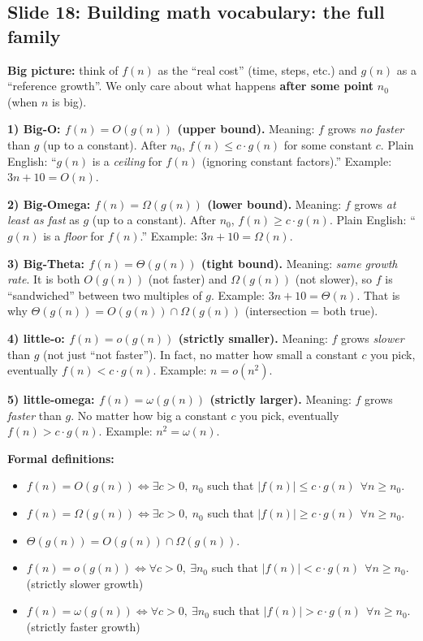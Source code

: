 \documentclass[11pt]{article}
\newcommand{\slide}[2]{\subsection*{Slide #1: #2}}
\begin{document}
\slide{18}{Building math vocabulary: the full family}
\textbf{Big picture:} think of $f(n)$ as the ``real cost'' (time, steps, etc.) and $g(n)$ as
a ``reference growth''. We only care about what happens \textbf{after some point} $n_0$
(when $n$ is big).

\textbf{1) Big-O: $f(n) = O(g(n))$ (upper bound).}
Meaning: $f$ grows \emph{no faster} than $g$ (up to a constant). After $n_0$,
$f(n) \le c \cdot g(n)$ for some constant $c$.
Plain English: ``$g(n)$ is a \emph{ceiling} for $f(n)$ (ignoring constant factors).''
Example: $3n + 10 = O(n)$.

\textbf{2) Big-Omega: $f(n) = \Omega(g(n))$ (lower bound).}
Meaning: $f$ grows \emph{at least as fast} as $g$ (up to a constant). After $n_0$,
$f(n) \ge c \cdot g(n)$.
Plain English: ``$g(n)$ is a \emph{floor} for $f(n)$.''
Example: $3n + 10 = \Omega(n)$.

\textbf{3) Big-Theta: $f(n) = \Theta(g(n))$ (tight bound).}
Meaning: \emph{same growth rate}. It is both $O(g(n))$ (not faster) and $\Omega(g(n))$
(not slower), so $f$ is ``sandwiched'' between two multiples of $g$.
Example: $3n + 10 = \Theta(n)$.
That is why $\Theta(g(n)) = O(g(n)) \cap \Omega(g(n))$ (intersection = both true).

\textbf{4) little-o: $f(n) = o(g(n))$ (strictly smaller).}
Meaning: $f$ grows \emph{slower} than $g$ (not just ``not faster''). In fact, no matter how
small a constant $c$ you pick, eventually $f(n) < c \cdot g(n)$.
Example: $n = o(n^2)$.

\textbf{5) little-omega: $f(n) = \omega(g(n))$ (strictly larger).}
Meaning: $f$ grows \emph{faster} than $g$. No matter how big a constant $c$ you pick,
eventually $f(n) > c \cdot g(n)$.
Example: $n^2 = \omega(n)$.

\textbf{Formal definitions:}
\begin{itemize}
  \item $f(n) = O(g(n)) \iff \exists c > 0,\ n_0$ such that $|f(n)| \le c \cdot g(n)\ \ \forall n \ge n_0$.
  \item $f(n) = \Omega(g(n)) \iff \exists c > 0,\ n_0$ such that $|f(n)| \ge c \cdot g(n)\ \ \forall n \ge n_0$.
  \item $\Theta(g(n)) = O(g(n)) \cap \Omega(g(n))$.
  \item $f(n) = o(g(n)) \iff \forall c > 0,\ \exists n_0$ such that $|f(n)| < c \cdot g(n)\ \ \forall n \ge n_0$. (strictly slower growth)
  \item $f(n) = \omega(g(n)) \iff \forall c > 0,\ \exists n_0$ such that $|f(n)| > c \cdot g(n)\ \ \forall n \ge n_0$. (strictly faster growth)
\end{itemize}
\end{document}
